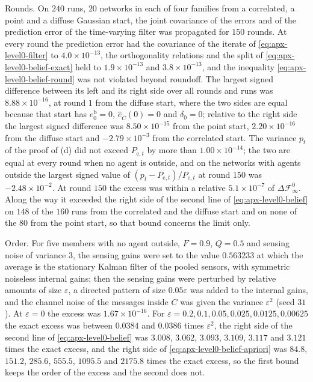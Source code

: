 \begin{numcheck}
Rounds. On $240$ runs, $20$ networks in each of four families from a correlated, a point and a diffuse Gaussian start, the joint covariance of the errors and of the prediction error of the time-varying filter was propagated for $150$ rounds. At every round the prediction error had the covariance of the iterate of \eqref{eq:apx-level0-filter} to $4.0\times10^{-13}$, the orthogonality relations and the split of \eqref{eq:apx-level0-belief-exact} held to $1.9\times10^{-13}$ and $3.8\times10^{-13}$, and the inequality \eqref{eq:apx-level0-belief-round} was not violated beyond roundoff. The largest signed difference between its left and its right side over all rounds and runs was $8.88\times10^{-16}$, at round $1$ from the diffuse start, where the two sides are equal because that start has $e^{\mathrm b}_0=0$, $\hat e_{\bar C}(0)=0$ and $\delta_0=0$; relative to the right side the largest signed difference was $8.50\times10^{-15}$ from the point start, $2.20\times10^{-16}$ from the diffuse start and $-2.79\times10^{-3}$ from the correlated start. The variance $p_t$ of the proof of (d) did not exceed $P_{\mathrm e,t}$ by more than $1.00\times10^{-14}$; the two are equal at every round when no agent is outside, and on the networks with agents outside the largest signed value of $(p_t-P_{\mathrm e,t})/P_{\mathrm e,t}$ at round $150$ was $-2.48\times10^{-2}$. At round $150$ the excess was within a relative $5.1\times10^{-7}$ of $\Delta\mathcal F^0_\infty$. Along the way it exceeded the right side of the second line of \eqref{eq:apx-level0-belief} on $148$ of the $160$ runs from the correlated and the diffuse start and on none of the $80$ from the point start, so that bound concerns the limit only.

Order. For five members with no agent outside, $F=0.9$, $Q=0.5$ and sensing noise of variance $3$, the sensing gains were set to the value $0.563233$ at which the average is the stationary Kalman filter of the pooled sensors, with symmetric noiseless internal gains; then the sensing gains were perturbed by relative amounts of size $\varepsilon$, a directed pattern of size $0.05\varepsilon$ was added to the internal gains, and the channel noise of the messages inside $C$ was given the variance $\varepsilon^2$ (seed $31$). At $\varepsilon=0$ the excess was $1.67\times10^{-16}$. For $\varepsilon=0.2,0.1,0.05,0.025,0.0125,0.00625$ the exact excess was between $0.0384$ and $0.0386$ times $\varepsilon^2$, the right side of the second line of \eqref{eq:apx-level0-belief} was $3.008$, $3.062$, $3.093$, $3.109$, $3.117$ and $3.121$ times the exact excess, and the right side of \eqref{eq:apx-level0-belief-apriori} was $84.8$, $151.2$, $285.6$, $555.5$, $1095.5$ and $2175.8$ times the exact excess, so the first bound keeps the order of the excess and the second does not.


\end{numcheck}
